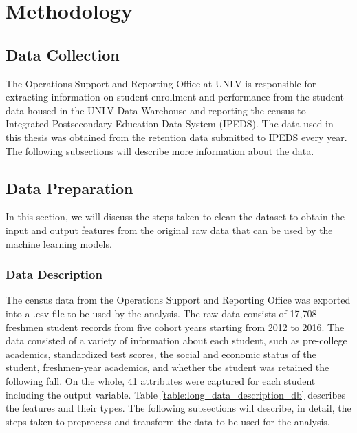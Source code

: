 \documentclass[11pt,openright]{report}
\begin{document}
\chapter{Methodology} \label{chapter:methodology}
\section{Data Collection}

The Operations Support and Reporting Office at UNLV is responsible for extracting information on student enrollment and performance from the student data housed in the UNLV Data Warehouse and reporting the census to Integrated Postsecondary Education Data System (IPEDS). The data used in this thesis was obtained from the retention data submitted to IPEDS every year. The following subsections will describe more information about the data.

\section {Data Preparation}
In this section, we will discuss the steps taken to clean the dataset to obtain the input and output features from the original raw data that can be used by the machine learning models. 
\subsection{Data Description}
The census data from the Operations Support and Reporting Office was exported into a .csv file to be used by the analysis. The raw data consists of 17,708 freshmen student records from five cohort years starting from 2012 to 2016. The data consisted of a variety of information about each student, such as pre-college academics, standardized test scores, the social and economic status of the student, freshmen-year academics, and whether the student was retained the following fall. On the whole, 41 attributes were captured for each student including the output variable. Table \ref{table:long_data_description_db} describes the features and their types. The following subsections will describe, in detail, the steps taken to preprocess and transform the data to be used for the analysis.
\end{document}
